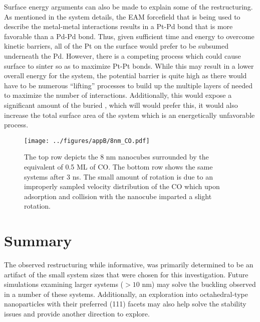 Surface energy arguments can also be made to explain some of the restructuring.
As mentioned in the system details, the EAM forcefield that is being used to
describe the metal-metal interactions results in a Pt-Pd bond that is more
favorable than a Pd-Pd bond.  Thus, given sufficient time and energy to
overcome kinetic barriers, all of the Pt on the surface would prefer to be
subsumed underneath the Pd. However, there is a competing process which could
cause surface  to sinter so as to maximize Pt-Pt bonds. While this may
result in a lower overall energy for the system, the potential barrier is quite
high as there would have to be numerous ``lifting'' processes to build up the
multiple layers of  needed to maximize the number of 
interactions. Additionally, this would expose a significant amount of the
buried , which will  would prefer this, it would also increase
the total surface area of the system which is an energetically unfavorable
process.


\begin{landscape}
\begin{figure}[p!]
\centering
  \texttt{[image: ../figures/appB/8nm\_CO.pdf]}
  \caption{The top row depicts the 8 nm nanocubes surrounded by the equivalent
of 0.5 ML of CO. The bottom row shows the same systems after 3 ns.  The small
amount of rotation is due to an improperly sampled velocity distribution of the
CO which upon adsorption and collision with the nanocube imparted a slight
rotation.}
  \label{fig:8nmCO}
\end{figure}
\end{landscape}



\section{Summary}
The observed restructuring while informative, was primarily determined to be an
artifact of the small system sizes that were chosen for this investigation.
Future simulations examining larger systems ($>10$ nm) may solve the buckling
observed in a number of these systems. Additionally, an exploration into
octahedral-type nanoparticles with their preferred (111) facets may also help
solve the stability issues and provide another direction to explore.
